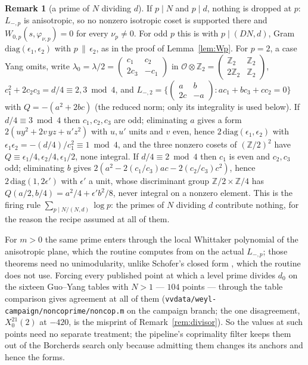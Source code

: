 \documentclass[11pt,reqno]{amsart}
\theoremstyle{plain}
\theoremstyle{definition}
\newtheorem{remark}[theorem]{Remark}
\newcommand{\Z}{\mathbb{Z}}
\begin{document}
\begin{remark}[a prime of $N$ dividing $d$]\label{rem:ramified}
If $p\mid N$ and $p\mid d$, nothing is dropped at $p$: $L_{-,p}$ is anisotropic, so no nonzero
isotropic coset is supported there and $W_{0,p}(s,\varphi_{\nu,p})=0$ for every $\nu_p\neq0$.
For odd $p$ this is \cite[Lemma~18(1)]{Yang} with $p\mid(DN,d)$, Gram
$\mathrm{diag}(\epsilon_1,\epsilon_2)$ with $p\,\|\,\epsilon_2$, as in the proof of
Lemma~\ref{lem:Wp}. For $p=2$, a case Yang omits, write $\lambda_0=\lambda/2=\begin{pmatrix}c_1&
c_2\\2c_3&-c_1\end{pmatrix}$ in $\mathcal O\otimes\Z_2=\begin{pmatrix}\Z_2&\Z_2\\2\Z_2&\Z_2
\end{pmatrix}$, $c_1^2+2c_2c_3=d/4\equiv2,3\bmod4$, and $L_{-,2}=\{\begin{pmatrix}a&b\\2c&-a
\end{pmatrix}:ac_1+bc_3+cc_2=0\}$ with $Q=-(a^2+2bc)$ (the reduced norm; only its integrality
is used below). If $d/4\equiv3\bmod4$ then $c_1,c_2,c_3$ are
odd; eliminating $a$ gives a form $2(uy^2+2v\,yz+u'z^2)$ with $u,u'$ units and $v$ even, hence
$2\,\mathrm{diag}(\epsilon_1,\epsilon_2)$ with $\epsilon_1\epsilon_2=-(d/4)/c_1^2\equiv1\bmod4$,
and the three nonzero cosets of $(\Z/2)^2$ have $Q\equiv\epsilon_1/4,\epsilon_2/4,\epsilon_1/2$,
none integral. If $d/4\equiv2\bmod4$ then $c_1$ is even and $c_2,c_3$ odd; eliminating $b$ gives
$2(a^2-2(c_1/c_3)ac-2(c_2/c_3)c^2)$, hence $2\,\mathrm{diag}(1,2\epsilon')$ with
$\epsilon'$ a unit, whose discriminant group $\Z/2\times\Z/4$ has $Q(a/2,b/4)=a^2/4+\epsilon'b^2/8$,
never integral on a nonzero element. This is the firing rule $\sum_{p\mid N/(N,d)}\log p$: the
primes of $N$ dividing $d$ contribute nothing, for the reason the recipe assumed at all of them.

For $m>0$ the same prime enters through the local Whittaker polynomial of the anisotropic plane,
which the routine computes from \cite[Thms.~4.3, 4.4]{KY} on the actual $L_{-,p}$; those theorems
need no unimodularity, unlike Schofer's closed form \cite[Thm.~4.1]{Schofer}, which the routine does
not use. Forcing every published point at which a level prime divides $d_0$ on the sixteen
Guo--Yang tables with $N>1$ --- $104$ points --- through the table comparison gives agreement at all
of them (\texttt{vvdata/weyl-campaign/noncoprime/noncop.m} on the campaign branch; the one
disagreement, $X_0^{21}(2)$ at $-420$, is the misprint of Remark~\ref{rem:divisor}). So the values
at such points need no separate treatment; the pipeline's coprimality filter keeps them out of the
Borcherds search only because admitting them changes its anchors and hence the forms.
\end{remark}
\end{document}
